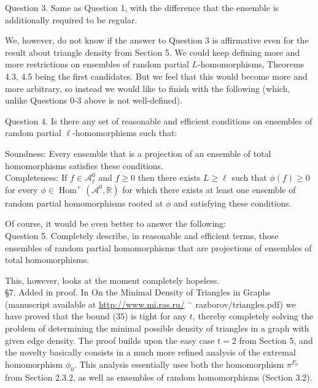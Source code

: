 \documentclass[10pt]{article}
\begin{document}
Question 3. Same as Question 1, with the difference that the ensemble is additionally required to be regular.

We, however, do not know if the answer to Question 3 is affirmative even for the result about triangle density from Section 5. We could keep defining more and more restrictions on ensembles of random partial $L$-homomorphisms, Theorems 4.3, 4.5 being the first candidates. But we feel that this would become more and more arbitrary, so instead we would like to finish with the following (which, unlike Questions 0-3 above is not well-defined).

Question 4. Is there any set of reasonable and efficient conditions on ensembles of random partial $\ell$-homomorphisms such that:

Soundness: Every ensemble that is a projection of an ensemble of total homomorphisms satisfies these conditions.\\
Completeness: If $f \in \mathcal{A}_{\ell}^{0}$ and $f \geq 0$ then there exists $L \geq \ell$ such that $\phi(f) \geq 0$ for every $\phi \in \operatorname{Hom}^{+}\left(\mathcal{A}^{0}, \mathbb{R}\right)$ for which there exists at least one ensemble of random partial homomorphisms rooted at $\phi$ and satisfying these conditions.

Of course, it would be even better to answer the following:\\
Question 5. Completely describe, in reasonable and efficient terms, those ensembles of random partial homomorphisms that are projections of ensembles of total homomorphisms.

This, however, looks at the moment completely hopeless.\\
§7. Added in proof. In On the Minimal Density of Triangles in Graphs (manuscript available at \href{http://www.mi.ras.ru/}{http://www.mi.ras.ru/} ${ }^{\sim}$ razborov/triangles.pdf) we have proved that the bound (35) is tight for any $t$, thereby completely solving the problem of determining the minimal possible density of triangles in a graph with given edge density. The proof builds upon the easy case $t=2$ from Section 5, and the novelty basically consists in a much more refined analysis of the extremal homomorphism $\phi_{0}$. This analysis essentially uses both the homomorphism $\pi^{F_{0}}$ from Section 2.3.2, as well as ensembles of random homomorphisms (Section 3.2).
\end{document}
